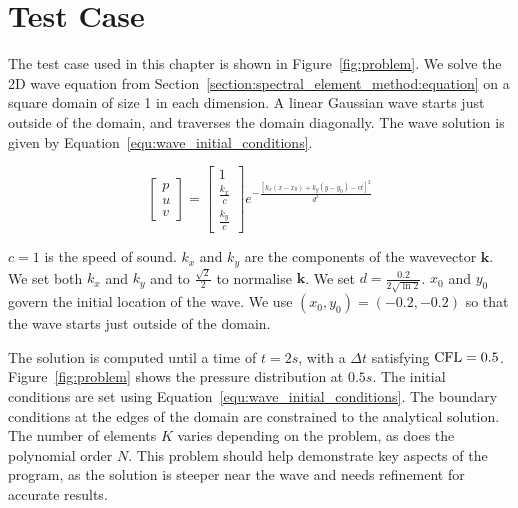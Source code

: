 \section{Test Case}\label{section:results:test_case}

The test case used in this chapter is shown in Figure~\ref{fig:problem}. We solve the 2D wave
equation from Section~\ref{section:spectral_element_method:equation} on a square domain of size 1 in
each dimension. A linear Gaussian wave starts just outside of the domain, and traverses the domain
diagonally. The wave solution is given by Equation~\ref{equ:wave_initial_conditions}.

\begin{equation} \label{equ:wave_initial_conditions}
    \begin{bmatrix}
        p \\ u \\ v
    \end{bmatrix} =
    \begin{bmatrix}
        1 \\ \frac{k_x}{c} \\ \frac{k_y}{c}
    \end{bmatrix}
    e^{-\frac{ {\left[ k_x \left(x - x_0 \right) + k_y \left(y - y_0 \right) -ct \right]}^2} {d^2}}
\end{equation}

\noindent
\(c = 1\) is the speed of sound. \(k_x\) and \(k_y\) are the components of the wavevector
\(\mathbf{k}\). We set both \(k_x\) and \(k_y\) and to \(\frac{\sqrt{2}}{2}\) to normalise
\(\mathbf{k}\). We set \(d = \frac{0.2}{2\sqrt{\ln{2}}}\). \(x_0\) and \(y_0\) govern the initial
location of the wave. We use \(\left(x_0, y_0\right) = \left(-0.2, -0.2\right)\) so that the wave starts just outside of the domain.

The solution is computed until a time of \(t = 2 s\), with a \(\Delta t\) satisfying \(\operatorname{CFL} = 0.5\).
Figure~\ref{fig:problem} shows the pressure distribution at \(0.5 s\). The initial conditions are
set using Equation~\ref{equ:wave_initial_conditions}. The boundary conditions at the edges of the
domain are constrained to the analytical solution. The number of elements \( K \) varies depending
on the problem, as does the polynomial order \( N \). This problem should help demonstrate key
aspects of the program, as the solution is steeper near the wave and needs refinement for accurate
results.

